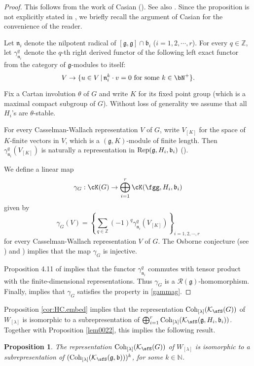 \documentclass[12pt,a4paper]{amsart}
\newcommand{\BN}{{\mathbb {N}}}
\newcommand{\CK}{{\mathcal {K}}}
\newcommand{\g}{\mathfrak g}
\renewcommand{\b}{\mathfrak b}
\newcommand{\n}{\mathfrak n}
\newcommand{\Z}{\mathbb{Z}}
\numberwithin{equation}{section}
\newtheorem{prop}[thm]{Proposition}
\theoremstyle{remark}
\def\Coh{\mathrm{Coh}}
\newcommand{\Lam}{{[\lambda]}}
\newcommand{\Grt}{\cK}
\begin{document}
\begin{proof}
This follows from the work of Casian (\cite{Cas}). See also {\cite{Mc}}. Since the proposition is not explicitly stated in \cite{Cas}, we briefly recall the argument of Casian for the convenience of the reader.



 Let $\n_i$ denote the nilpotent radical of $[\g,\g]\cap \b_i$ ($i=1,2, \cdots,r$).
 For every $q\in \Z$, let $\gamma_{\n_i}^q$ denote the $q$-th right derived functor of the following left exact functor from the category of $\g$-modules to itself:
 \[
   V\rightarrow \{u\in V\,|\, \n_i^k \cdot v=0\textrm{ for some $k\in \bN^+$}\}.
 \]

Fix a Cartan involution $\theta$ of $G$ and write $K$ for its fixed point group (which is a maximal compact subgroup of $G$).  Without loss of generality we assume that all $H_i$'s are $\theta$-stable.

For every Casselman-Wallach representation $V$ of $G$, write $V_{[K]}$ for the space of $K$-finite vectors in $V$, which is a $(\g,K)$-module of finite length. Then   $\gamma_{\n_i}^q(V_{[K]})$ is naturally a representation in $\Rep(\g, H_i, \b_i)$ (\cite[Corollary 4.9]{Cas}).

We define a linear map
 \[
\gamma_{G}: \Grt(G)\rightarrow  \bigoplus_{i=1}^{r} \Grt(\fgg,H_{i},\b_{i})
 \]
 given by
 \[
   \gamma_{G}(V)= \left\{\sum_{q\in \Z} (-1)^{q} \gamma^{q}_{\n_i}(V_{[K]})\right\}_{i=1,2, \cdots, r}
 \]
for every Casselman-Wallach representation $V$ of $G$. The Osborne conjecture (see \cite[Theorem 3.1]{Cas}) and \cite[Corollary 4.9]{Cas}) implies that the map $\gamma_{G}$ is injective.

Proposition 4.11 of \cite{Cas} implies that the functor $\gamma_{\n_i}^q$ commutes with tensor product with the finite-dimensional representations. Thus $\gamma_{G}$ is a $\mathcal R(\g)$-homomorphism. Finally, \cite[Corollary 4.15]{Cas} implies that $\gamma_{G}$ satisfies the property in \eqref{gammag}.
\end{proof}




Proposition \ref{cor:HC.embed} implies that the representation $\Coh_{\Lam}(\CK_\sfS(G))$ of $W_{[\lambda]}$ is isomorphic to a subrepresentation of
$\bigoplus_{i=1}^r \Coh_{\Lam}(\CK_{\sfS}(\g,H_i,\b_i))$. Together with Proposition \ref{lem0022}, this implies the following result.

 \begin{prop}\label{lem0033}
The representation $\Coh_{\Lam}(\CK_\sfS(G))$  of $W_{[\lambda]}$ is isomorphic to a subrepresentation of $(\Coh_{\Lam}(\CK_\sfS(\g,\b)))^k$, for some $k\in \BN$.
     \end{prop}
\end{document}
